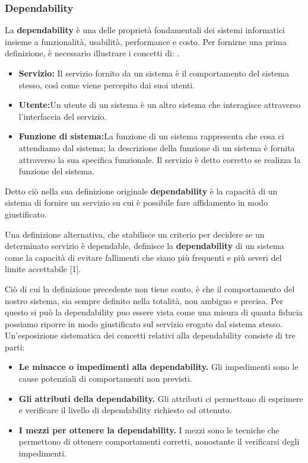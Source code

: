 \documentclass[14pt]{extarticle}
\begin{document}
\subsubsection{Dependability}
La \textbf{dependability} è una delle proprietà fondamentali dei sistemi informatici insieme a funzionalità, usabilità, performance e costo. Per fornirne una prima definizione, è necessario illustrare i concetti di: \cite{avizienis2004basic}.
\begin{itemize}
\item \textbf{Servizio:} Il servizio fornito da un sistema è il comportamento del sistema stesso, così come viene percepito dai suoi utenti.
\item \textbf{Utente:}Un utente di un sistema è un altro sistema che interagisce attraverso l’interfaccia del servizio.
\item \textbf{Funzione di sistema:}La funzione di un sistema rappresenta che cosa ci attendiamo dal sistema; la descrizione della funzione di un sistema è fornita attraverso la sua specifica funzionale. Il servizio è detto corretto se realizza la funzione del sistema.
\end{itemize}

Detto ciò nella sua definizione originale \textbf{dependability} è
la capacità di un sistema di fornire un servizio su cui è possibile fare affidamento in
modo giustificato.\cite{bondavalli2011analisi}

Una definizione alternativa, che stabilisce un criterio per decidere se un determinato servizio è dependable, definisce la \textbf{dependability} di un sistema
come la capacità di evitare fallimenti che siano più frequenti e più severi del
limite accettabile [1].

Ciò di cui la definizione precedente non tiene conto, è che il comportamento del nostro sistema, sia sempre definito nella totalità, non ambiguo e precisa. 
Per questo si può la dependability puo essere vista come una misura di quanta fiducia possiamo riporre in modo giustificato sul servizio erogato dal sistema stesso.\cite{bondavalli2011analisi}
Un’esposizione sistematica dei concetti relativi alla dependability consiste di tre parti:

\begin{itemize}
\item \textbf{Le minacce o impedimenti alla dependability.} Gli impedimenti sono le
cause potenziali di comportamenti non previsti.
\item \textbf{Gli attributi della dependability.} Gli attributi ci permettono di esprimere
e verificare il livello di dependability richiesto od ottenuto.
\item \textbf{I mezzi per ottenere la dependability.} I mezzi sono le tecniche che
permettono di ottenere comportamenti corretti, nonostante il verificarsi
degli impedimenti.
\end{itemize}
\end{document}

